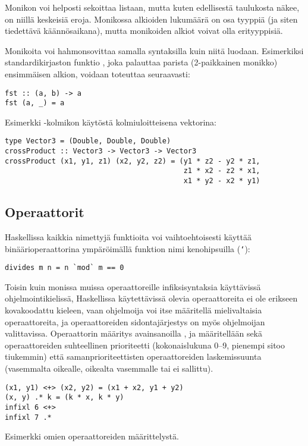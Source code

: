 Monikon voi helposti sekoittaa listaan,
mutta kuten edellisestä taulukosta näkee,
on niillä keskeisiä eroja.
Monikossa alkioiden lukumäärä on osa tyyppiä (ja siten tiedettävä käännösaikana),
mutta monikoiden alkiot voivat olla erityyppisiä.

Monikoita voi hahmonsovittaa samalla syntaksilla kuin niitä luodaan.
Esimerkiksi standardikirjaston funktio ,
joka palauttaa parista (2-paikkainen monikko) ensimmäisen alkion,
voidaan toteuttaa seuraavasti:
\begin{verbatim}
fst :: (a, b) -> a
fst (a, _) = a
\end{verbatim}
Esimerkki -kolmikon käytöstä kolmiuloitteisena vektorina:
\begin{verbatim}
type Vector3 = (Double, Double, Double)
crossProduct :: Vector3 -> Vector3 -> Vector3
crossProduct (x1, y1, z1) (x2, y2, z2) = (y1 * z2 - y2 * z1,
                                          z1 * x2 - z2 * x1,
                                          x1 * y2 - x2 * y1)
\end{verbatim}

\subsection{Operaattorit}
Haskellissa kaikkia nimettyjä funktioita voi vaihtoehtoisesti käyttää binäärioperaattorina ympäröimällä funktion nimi kenohipsuilla (\texttt{`}):
\begin{verbatim}
divides m n = n `mod` m == 0
\end{verbatim}

Toisin kuin monissa muissa operaattoreille infiksisyntaksia käyttävissä ohjelmointikielissä,
Haskellissa käytettävissä olevia operaattoreita ei ole erikseen kovakoodattu kieleen,
vaan ohjelmoija voi itse määritellä mielivaltaisia operaattoreita,
ja operaattoreiden sidontajärjestys on myös ohjelmoijan valittavissa.
Operaattorin määritys avainsanoilla ,  ja  määritellään sekä
operaattoreiden suhteellinen prioriteetti (kokonaislukuna 0--9, pienempi sitoo tiukemmin) että
samanprioriteettisten operaattoreiden laskemissuunta
(vasemmalta oikealle, oikealta vasemmalle tai ei sallittu).

\begin{listing}[H]
\begin{verbatim}
(x1, y1) <+> (x2, y2) = (x1 + x2, y1 + y2)
(x, y) .* k = (k * x, k * y)
infixl 6 <+>
infixl 7 .*
\end{verbatim}
\label{lst:operators-example}
\caption{Esimerkki omien operaattoreiden määrittelystä.}
\end{listing}

